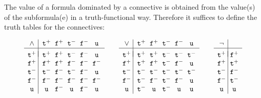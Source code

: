 \documentclass{\filespath jancl}
\newcommand{\twts}{{{\sf t}^+}}
\newcommand{\twfs}{{{\sf f}^+}}
\newcommand{\twti}{{{\sf t}^-}}
\newcommand{\twfi}{{{\sf f}^-}}
\newcommand{\twu}{{\sf u}}
\def\sf{\tt}
\begin{document}
\begin{definition}\label{Def:truth-tables}    
  The value of a formula dominated by a connective is obtained from the
  value(s) of the subformula(e) in a truth-functional way. Therefore it
  suffices to define the truth tables for the connectives:

\[\begin{array}{c@{\;}|@{\;\;}c@{\;\;}c@{\;\;}c@{\;\;}c@{\;\;}c}
\land & \twts & \twfs & \twti & \twfi & \twu\\ \hline\\[-1.9ex]
\twts & \twts & \twfs & \twti & \twfi & \twu\\
\twfs & \twfs & \twfs & \twfi & \twfi & \twfi\\
\twti & \twti & \twfi & \twti & \twfi & \twu\\
\twfi & \twfi & \twfi & \twfi & \twfi & \twfi\\
\twu  & \twu  & \twfi & \twu  & \twfi & \twu
\end{array}\qquad
\begin{array}{c@{\;}|@{\;\;}c@{\;\;}c@{\;\;}c@{\;\;}c@{\;\;}c}
\lor  & \twts & \twfs & \twti & \twfi & \twu\\ \hline\\[-1.9ex]
\twts & \twts & \twts & \twti & \twti & \twti\\
\twfs & \twts & \twfs & \twti & \twfi & \twu\\
\twti & \twti & \twti & \twti & \twti & \twti\\
\twfi & \twti & \twfi & \twti & \twfi & \twu\\
\twu  & \twti & \twu  & \twti & \twu  & \twu
\end{array}\qquad
\begin{array}{c@{\;}|@{\;}c}
\neg  & \\ \hline\\[-1.9ex]
\twts & \twfs   \\
\twfs & \twts  \\
\twti & \twfi \\
\twfi & \twti \\
\twu  & \twu
\end{array}\]\vspace{0ex}


\end{definition}
\end{document}
